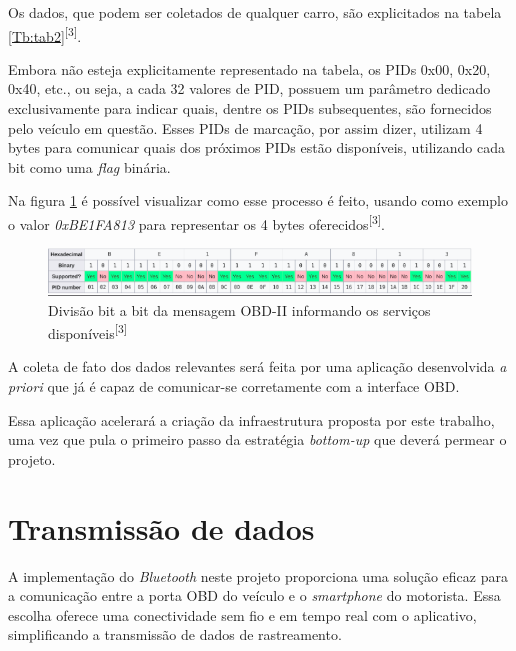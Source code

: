 Os dados, que podem ser coletados de qualquer carro, são explicitados na tabela \ref{Tb:tab2}\textsuperscript{[3]}.





Embora não esteja explicitamente representado na tabela, os PIDs 0x00, 0x20, 0x40, etc., ou seja, a cada 32 valores de PID, possuem um parâmetro dedicado exclusivamente para indicar quais, dentre os PIDs subsequentes, são fornecidos pelo veículo em questão. Esses PIDs de marcação, por assim dizer, utilizam 4 bytes para comunicar quais dos próximos PIDs estão disponíveis, utilizando cada bit como uma \textit{flag} binária. 

Na figura \ref{fig:bitwise_obd2} é possível visualizar como esse processo é feito, usando como exemplo o valor \textit{0xBE1FA813} para representar os 4 bytes oferecidos\textsuperscript{[3]}.

\begin{figure}[hp]
    \centering
    
    \includegraphics[scale=0.7]{figures/tabela_dados_disponiveis.png}
    
    \caption{Divisão bit a bit da mensagem OBD-II informando os serviços disponíveis\textsuperscript{[3]}}
    
    \label{fig:bitwise_obd2}
\end{figure}


A coleta de fato dos dados relevantes será feita por uma aplicação desenvolvida \textit{a priori} que já é capaz de comunicar-se corretamente com a interface OBD.

Essa aplicação acelerará a criação da infraestrutura proposta por este trabalho, uma vez que pula o primeiro passo da estratégia \textit{bottom-up} que deverá permear o projeto.



\section{Transmissão de dados}

A implementação do \textit{Bluetooth} neste projeto proporciona uma solução eficaz para a comunicação entre a porta OBD do veículo e o \textit{smartphone} do motorista. Essa escolha oferece uma conectividade sem fio e em tempo real com o aplicativo, simplificando a transmissão de dados de rastreamento.

